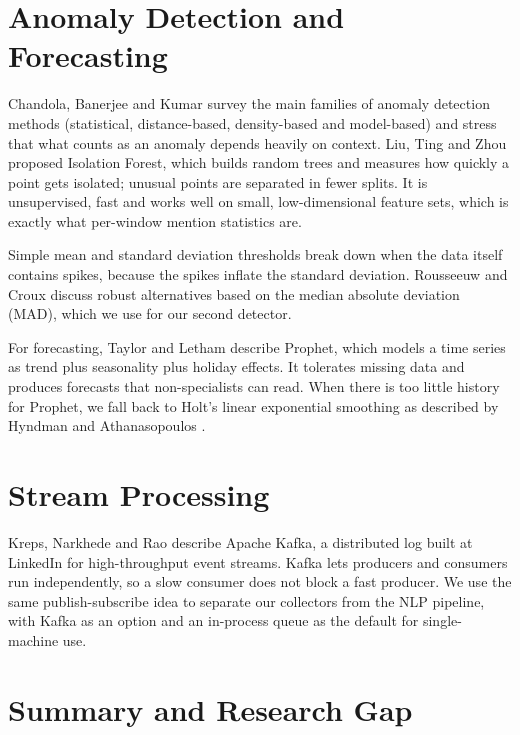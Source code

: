 \documentclass[12pt,a4paper]{report}
\begin{document}
\section{Anomaly Detection and Forecasting}

Chandola, Banerjee and Kumar \cite{chandola2009} survey the main families of anomaly detection methods (statistical, distance-based, density-based and model-based) and stress that what counts as an anomaly depends heavily on context. Liu, Ting and Zhou \cite{liu2008} proposed Isolation Forest, which builds random trees and measures how quickly a point gets isolated; unusual points are separated in fewer splits. It is unsupervised, fast and works well on small, low-dimensional feature sets, which is exactly what per-window mention statistics are.

Simple mean and standard deviation thresholds break down when the data itself contains spikes, because the spikes inflate the standard deviation. Rousseeuw and Croux \cite{rousseeuw1993} discuss robust alternatives based on the median absolute deviation (MAD), which we use for our second detector.

For forecasting, Taylor and Letham \cite{taylor2018} describe Prophet, which models a time series as trend plus seasonality plus holiday effects. It tolerates missing data and produces forecasts that non-specialists can read. When there is too little history for Prophet, we fall back to Holt's linear exponential smoothing as described by Hyndman and Athanasopoulos \cite{hyndman2021}.

\section{Stream Processing}

Kreps, Narkhede and Rao \cite{kreps2011} describe Apache Kafka, a distributed log built at LinkedIn for high-throughput event streams. Kafka lets producers and consumers run independently, so a slow consumer does not block a fast producer. We use the same publish-subscribe idea to separate our collectors from the NLP pipeline, with Kafka as an option and an in-process queue as the default for single-machine use.

\section{Summary and Research Gap}
\end{document}
